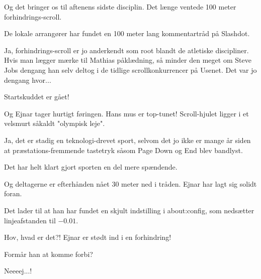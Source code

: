 \documentclass[a4paper,11pt]{article}
\begin{document}
\begin{sketch}

   Og det bringer os til aftenens sidste disciplin. Det længe ventede
  100 meter forhindrings-scroll.


   De lokale arrangører har fundet en 100 meter lang kommentartråd på
  Slashdot.

   Ja, forhindrings-scroll er jo anderkendt som root blandt
  de atletiske discipliner.  Hvis man lægger mærke til Mathias
  påklædning, så minder den meget om Steve Jobs dengang han selv
  deltog i de tidlige scrollkonkurrencer på Usenet.  Det var jo
  dengang hvor...


   Startskuddet er gået!

   Og Ejnar tager hurtigt føringen. Hans mus er top-tunet!
  Scroll-hjulet ligger i et velsmurt såkaldt "olympisk leje".

   Ja, det er stadig en teknologi-drevet sport, selvom det jo
  ikke er mange år siden at præstations-fremmende tastetryk såsom Page
  Down og End blev bandlyst.

   Det har helt klart gjort sporten en del mere spændende.

   Og deltagerne er efterhånden nået 30 meter ned i tråden. Ejnar har
  lagt sig solidt foran.

   Det lader til at han har fundet en skjult indstilling i
  about:config, som nedsætter linjeafstanden til $-0.01$.


   Hov, hvad er det?! Ejnar er stødt ind i en forhindring!


   Formår han at komme forbi?


   Neeeej...!


\end{sketch}
\end{document}
